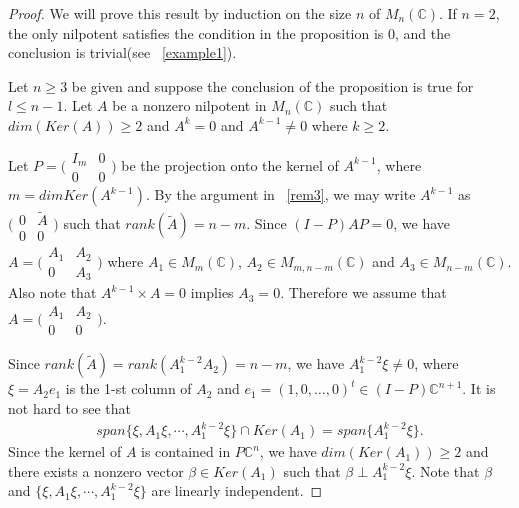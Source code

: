 \documentclass[a4paper,10pt]{amsart}
\theoremstyle{refs}
\newcommand{\C}{\mathbb C} %
\begin{document}
\begin{proof}
We will prove this result by induction on the size $n$ of
$M_n(\C)$.
If $n=2$, the only nilpotent satisfies the condition in the proposition is $0$,
and the conclusion is trivial(see ~\cref{example1}).

Let $n \geq 3$ be given and suppose the conclusion of the proposition is true
for $l \leq n-1$. Let $A$ be a nonzero nilpotent in $M_{n}(\C)$ such that
$dim(Ker(A)) \geq 2$ and $A^{k} = 0$ and $A^{k-1} \neq 0$ where $k \geq 2$.

Let $P =
\bigl(\begin{smallmatrix}
       I_{m} & 0\\
       0 & 0
      \end{smallmatrix}\bigr)$ be the
projection onto the kernel of $A^{k-1}$, where $m = dimKer(A^{k-1})$.
By the argument in ~\cref{rem3}, we may write $A^{k-1}$ as
$\bigl(\begin{smallmatrix}
       0 & \tilde{A}\\
       0 & 0
      \end{smallmatrix}\bigr)$ such that
$rank(\tilde{A})=n-m$. Since $(I-P)AP = 0$, we have $A =
\bigl(\begin{smallmatrix}
       A_1 & A_2\\
       0 & A_3
      \end{smallmatrix}\bigr)$ where $A_1 \in M_{m}(\C)$, $A_2 \in
M_{m,n-m}(\C)$ and $A_3 \in M_{n-m}(\C)$.
Also note that $A^{k-1} \times A = 0$ implies $A_3 = 0$. Therefore we assume
that $A = \bigl(\begin{smallmatrix}
       A_{1} & A_{2}\\
       0 & 0
      \end{smallmatrix}\bigr)$.


Since $rank(\tilde{A}) = rank(A_{1}^{k-2}A_{2})=n-m$, we have
$A_{1}^{k-2}\xi \neq 0$, where $\xi = A_{2}e_1$ is the 1-st column of $A_{2}$
and $e_1 = (1, 0, \ldots, 0)^{t} \in (I-P)\C^{n+1}$.
It is not hard to see that
\begin{align*}
span\{\xi,A_{1}\xi,\cdots,A^{k-2}_{1}\xi \} \cap Ker(A_{1}) =
span\{ A_{1}^{k-2}\xi \}.
\end{align*}
Since the kernel of $A$ is contained in $P\C^{n}$, we have
$dim(Ker(A_{1}))\geq 2$ and there exists a nonzero vector $\beta\in Ker(A_{1})$
such that $\beta\perp
A_{1}^{k-2}\xi$. Note that
$\beta$ and $\{\xi,A_{1}\xi,\cdots,A_{1}^{k-2}\xi\}$ are linearly
independent.


\end{proof}
\end{document}
